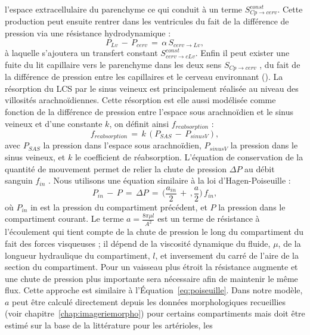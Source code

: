 l’espace extracellulaire du parenchyme ce qui conduit à un terme $S^{const}_{Cp\rightarrow cerv}$. Cette production peut
ensuite rentrer dans les ventricules du fait de la différence de pression via une résistance
hydrodynamique :
\begin{equation}
P_{Lv}\,-\,P_{cerv}\,=\,\alpha\,S_{cerv\rightarrow Lv},
\end{equation}
à laquelle s’ajoutera un transfert constant $S^{const}_{cerv\rightarrow cLv}$. Enfin il peut exister une fuite du lit capillaire
vers le parenchyme dans les deux sens $S_{Cp\rightarrow cerv}$ , du fait de la différence de pression entre les capillaires
et le cerveau environnant (\cite{Starling1896}). La résorption du LCS par le sinus veineux est principalement réalisée
au niveau des villosités arachnoïdiennes. Cette résorption est elle aussi modélisée comme fonction de
la différence de pression entre l’espace sous arachnoïdien et le sinus veineux et d’une constante $k$, on
définit ainsi $f_{reabsorption}$ :
\begin{equation}
f_{reabsorption}\,=\,k\,(P_{SAS}\,-\,P_{sinusV}),
\end{equation}
avec $P_{SAS}$ la pression dans l’espace sous arachnoïdien, $P_{sinusV}$ la pression dans le sinus veineux, et $k$
le coefficient de réabsorption.
L’équation de conservation de la quantité de mouvement permet de relier la chute de pression
$\Delta P$ au débit sanguin $f_{in}$ . Nous utilisons une équation similaire à la loi d’Hagen-Poiseuille :
\begin{equation}
\label{eq:flux}
P_{in}\,-\,P\,=\,\Delta P\,=\,\biggl(\frac{a_{in}}{2}\,+\,,\frac{a}{2}\biggr)\,f_{in},
\end{equation}
où $P_{in}$ in est la pression du compartiment précédent, et $P$ la pression dans le compartiment courant. Le
terme $a=\frac{8\pi \mu l}{A^2}$ est un terme de résistance à l’écoulement qui tient compte de la chute de pression le long du
compartiment du fait des forces visqueuses ; il dépend de la viscosité dynamique du fluide, $\mu$, de la
longueur hydraulique du compartiment, $l$, et inversement du carré de l’aire de la section du compartiment. Pour un
vaisseau plus étroit la résistance augmente et une chute de pression plus importante sera nécessaire
afin de maintenir le même flux. Cette approche est similaire à l’Équation~\ref{eq:poiseuille}. Dans notre modèle, $a$
peut être calculé directement depuis les données morphologiques recueillies (voir chapitre~\ref{chap:imageriemorpho}) pour
certains compartiments mais doit être estimé sur la base de la littérature pour les artérioles, les
